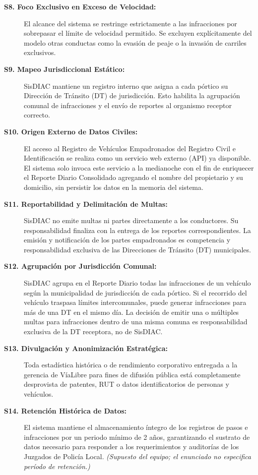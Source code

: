 \documentclass[12pt,letterpaper]{article}
\begin{document}
\begin{description}
	\item[\textbf{S8. Foco Exclusivo en Exceso de Velocidad:}] El alcance del sistema se restringe estrictamente a las infracciones por sobrepasar el límite de velocidad permitido. Se excluyen explícitamente del modelo otras conductas como la evasión de peaje o la invasión de carriles exclusivos.

	\item[\textbf{S9. Mapeo Jurisdiccional Estático:}] SisDIAC mantiene un registro interno que asigna a cada pórtico su Dirección de Tránsito (DT) de jurisdicción. Esto habilita la agrupación comunal de infracciones y el envío de reportes al organismo receptor correcto.

	\item[\textbf{S10. Origen Externo de Datos Civiles:}] El acceso al Registro de Vehículos Empadronados del Registro Civil e Identificación se realiza como un servicio web externo (API) ya disponible. El sistema solo invoca este servicio a la medianoche con el fin de enriquecer el Reporte Diario Consolidado agregando el nombre del propietario y su domicilio, sin persistir los datos en la memoria del sistema.

	\item[\textbf{S11. Reportabilidad y Delimitación de Multas:}] SisDIAC no emite multas ni partes directamente a los conductores. Su responsabilidad finaliza con la entrega de los reportes correspondientes. La emisión y notificación de los partes empadronados es competencia y responsabilidad exclusiva de las Direcciones de Tránsito (DT) municipales.

	\item[\textbf{S12. Agrupación por Jurisdicción Comunal:}] SisDIAC agrupa en el Reporte Diario todas las infracciones de un vehículo según la municipalidad de jurisdicción de cada pórtico. Si el recorrido del vehículo traspasa límites intercomunales, puede generar infracciones para más de una DT en el mismo día. La decisión de emitir una o múltiples multas para infracciones dentro de una misma comuna es responsabilidad exclusiva de la DT receptora, no de SisDIAC.

	\item[\textbf{S13. Divulgación y Anonimización Estratégica:}] Toda estadística histórica o de rendimiento corporativo entregada a la gerencia de VíaLibre para fines de difusión pública está completamente desprovista de patentes, RUT o datos identificatorios de personas y vehículos.

	\item[\textbf{S14. Retención Histórica de Datos:}] El sistema mantiene el almacenamiento íntegro de los registros de pasos e infracciones por un periodo mínimo de 2 años, garantizando el sustrato de datos necesario para responder a los requerimientos y auditorías de los Juzgados de Policía Local. \textit{(Supuesto del equipo; el enunciado no especifica período de retención.)}


\end{description}
\end{document}
